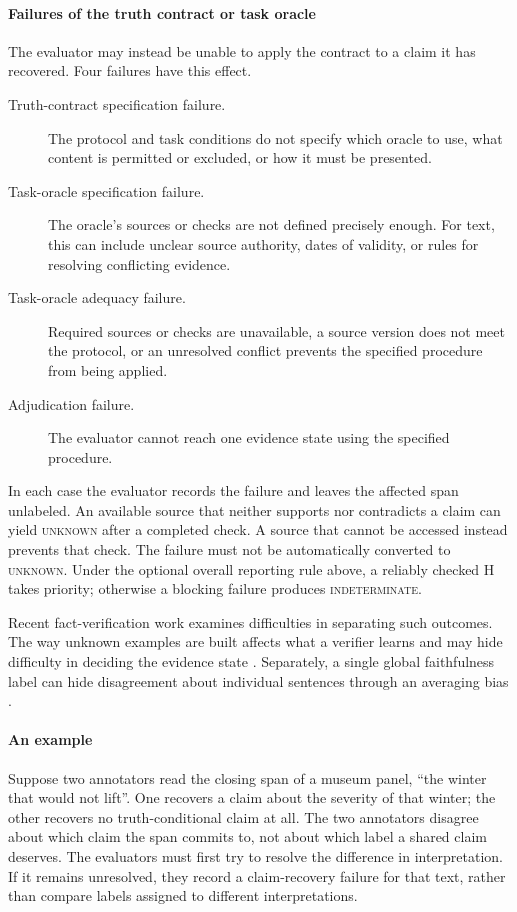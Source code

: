 \documentclass{clv2025}
\begin{document}
\paragraph{Failures of the truth contract or task oracle}
The evaluator may instead be unable to apply the contract to a claim it has
recovered. Four failures have this effect.
\begin{description}
  \item[Truth-contract specification failure.] The protocol and task conditions
        do not specify which oracle to use, what content is permitted or
        excluded, or how it must be presented.
  \item[Task-oracle specification failure.] The oracle's sources or checks are
        not defined precisely enough. For text, this can include unclear source
        authority, dates of validity, or rules for resolving conflicting evidence.
  \item[Task-oracle adequacy failure.] Required sources or checks are unavailable,
        a source version does not meet the protocol, or an unresolved conflict
        prevents the specified procedure from being applied.
  \item[Adjudication failure.] The evaluator cannot reach one evidence state
        using the specified procedure.
\end{description}
In each case the evaluator records the failure and leaves the affected span
unlabeled.
An available source that neither supports nor contradicts a claim can yield
\textsc{unknown} after a completed check. A source that cannot be accessed
instead prevents that check. The failure must not be automatically converted
to \textsc{unknown}. Under the optional overall reporting rule above, a
reliably checked H takes priority; otherwise a blocking failure produces
\textsc{indeterminate}.

Recent fact-verification work examines difficulties in separating such
outcomes. The way unknown examples are built affects what a verifier learns
and may hide difficulty in deciding the evidence state
\citep{qiu_evidence_2026}. Separately, a single global faithfulness label can
hide disagreement about individual sentences through an averaging bias
\citep{zhang_averaging_2026}.

\paragraph{An example}
Suppose two annotators read the closing span of a museum panel, ``the winter
that would not lift''.
One recovers a claim about the severity of that winter; the other recovers no
truth-conditional claim at all.
The two annotators disagree about which claim the span commits to, not about
which label a shared claim deserves.
The evaluators must first try to resolve the difference in interpretation.
If it remains unresolved, they record a claim-recovery failure for that text,
rather than compare labels assigned to different interpretations.
\end{document}

